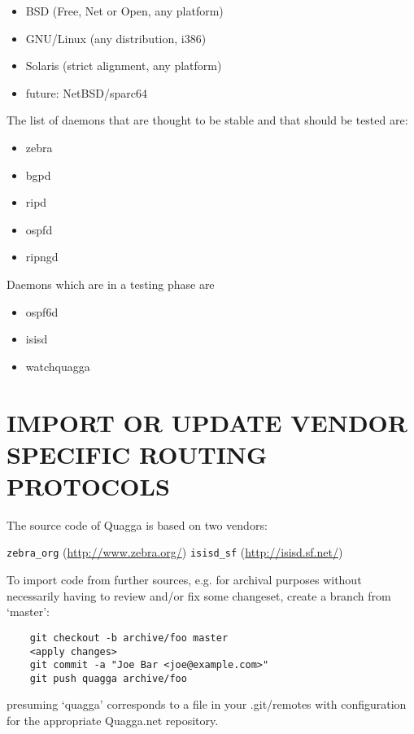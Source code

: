 \documentclass[oneside]{article}
\begin{document}
\begin{itemize}
  \item BSD (Free, Net or Open, any platform)
  \item GNU/Linux (any distribution, i386)
  \item Solaris (strict alignment, any platform)
  \item future: NetBSD/sparc64
\end{itemize}

The list of daemons that are thought to be stable and that should be
tested are:

\begin{itemize}
  \item zebra
  \item bgpd
  \item ripd
  \item ospfd
  \item ripngd
\end{itemize}
Daemons which are in a testing phase are

\begin{itemize}
  \item ospf6d
  \item isisd
  \item watchquagga
\end{itemize}

\section{IMPORT OR UPDATE VENDOR SPECIFIC ROUTING PROTOCOLS}

The source code of Quagga is based on two vendors:

   \verb|zebra_org| (\url{http://www.zebra.org/})
   \verb|isisd_sf| (\url{http://isisd.sf.net/})

To import code from further sources, e.g. for archival purposes without
necessarily having to review and/or fix some changeset, create a branch from
`master':

\begin{verbatim}
	git checkout -b archive/foo master
	<apply changes>
	git commit -a "Joe Bar <joe@example.com>"
	git push quagga archive/foo
\end{verbatim}

presuming `quagga' corresponds to a file in your .git/remotes with
configuration for the appropriate Quagga.net repository.
\end{document}
